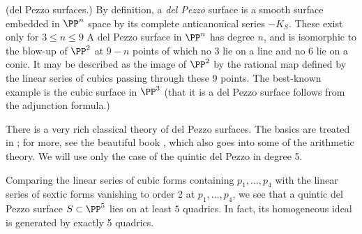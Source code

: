 \begin{fact} (del Pezzo surfaces.)\label{delPezzoSurfaces}
By definition,
a \emph{del Pezzo} surface is a smooth surface embedded in $\PP^n$ space by its complete anticanonical series $-K_S$. These exist only for $3\leq n\leq 9$ A del Pezzo surface in $\PP^n$ has degree $n$, and is isomorphic to the blow-up of $\PP^2$ at $9-n$ points of which no 3 lie on a line and no 6 lie on a conic. It may be described as the image of $\PP^2$ by the rational map defined by the linear series of cubics passing through these 9 points. The best-known example is the cubic surface in $\PP^3$ (that it is a del Pezzo surface follows from the adjunction formula.)

There is a very rich classical theory of del Pezzo surfaces. The basics are treated in \cite[pp. 45--50]{Beauville}; for more, see the
beautiful book \cite{Manin}, which also goes into some of the arithmetic theory. We will use only the case of the quintic del Pezzo in degree 5.
\

%
%
%

Comparing the linear series  of cubic forms containing $p_1,\dots,p_4$ with the linear series  of sextic forms vanishing to order 2 at $p_1,\dots,p_4$, we see that a quintic del Pezzo surface $S \subset \PP^5$ lies on at least $5$ quadrics. In fact, its homogeneous ideal is generated by exactly 5 quadrics.


%
%
%



\end{fact}
